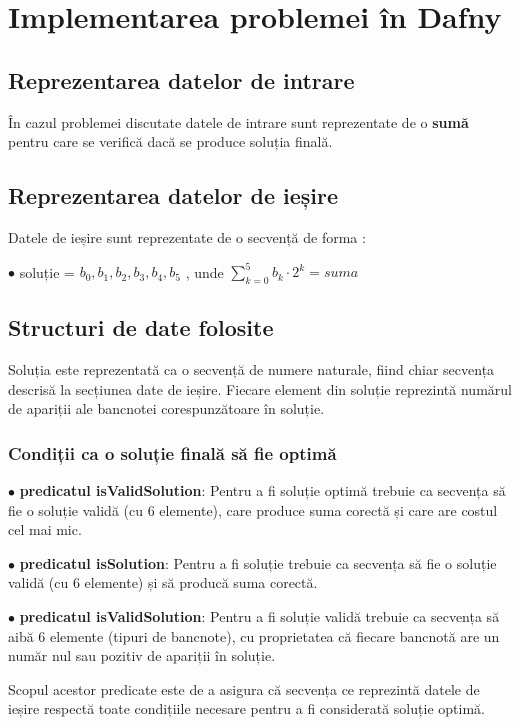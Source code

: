 \chapter{Implementarea problemei în Dafny}


\section{ Reprezentarea datelor de intrare }
În cazul problemei discutate datele de intrare sunt reprezentate de o \textbf{sumă} 
pentru care se verifică dacă se produce soluția finală.

\section{ Reprezentarea datelor de ieșire}
Datele de ieșire sunt reprezentate de o secvență de forma : \par
$\bullet$ soluție  = { $b_{0}, b_{1}, b_{2}, b_{3}, b_{4}, b_{5}$} , unde $\sum_{k=0}^{5} b_{k} \cdot 2^{k} = suma $

\section{ Structuri de date folosite}
Soluția este reprezentată ca o secvență de numere naturale, fiind chiar secvența descrisă la secțiunea date de ieșire.
Fiecare element din soluție reprezintă numărul de apariții ale bancnotei corespunzătoare în soluție. 

\subsection{Condiții ca o soluție finală să fie optimă}
$\bullet$ \textbf{predicatul isValidSolution}: Pentru a fi soluție optimă trebuie ca secvența să fie o soluție validă (cu 6 elemente), 
care produce suma corectă și care are costul cel mai mic.\par
$\bullet$ \textbf{predicatul isSolution}: Pentru a fi soluție trebuie ca secvența să fie o soluție validă (cu 6 elemente) și
să producă suma corectă.\par
$\bullet$ \textbf{predicatul isValidSolution}: Pentru a fi soluție validă trebuie ca secvența să aibă 6 elemente (tipuri de bancnote), cu 
proprietatea că fiecare bancnotă are un număr nul sau pozitiv de apariții în soluție.\par

Scopul acestor predicate este de a asigura că secvența ce reprezintă datele de ieșire respectă toate condițiile necesare
pentru a fi considerată soluție optimă.
    